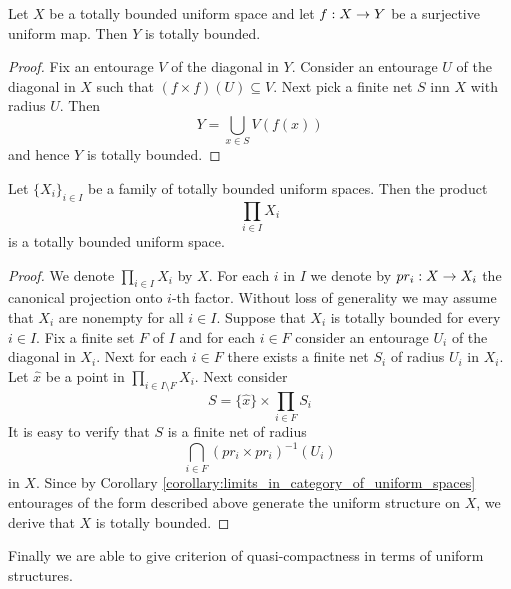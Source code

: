\begin{theorem}\label{theorem:surjective_image_of_totally_bounded_space_is_totally_bounded}
	Let $X$ be a totally bounded uniform space and let $f:X\rightarrow Y$ be a surjective uniform map. Then $Y$ is totally bounded.
\end{theorem}
\begin{proof}
	Fix an entourage $V$ of the diagonal in $Y$. Consider an entourage $U$ of the diagonal in $X$ such that $\left(f\times f\right)\left(U\right) \subseteq V$. Next pick a finite net $S$ inn $X$ with radius $U$. Then
	$$Y = \bigcup_{x\in S}V\left(f(x)\right)$$
	and hence $Y$ is totally bounded.
\end{proof}

\begin{theorem}\label{theorem:product_of_totally_bounded_spaces_is_totally_bounded}
	Let $\{X_i\}_{i \in I}$ be a family of totally bounded uniform spaces. Then the product
	$$\prod_{i \in I}X_i$$
	is a totally bounded uniform space.
\end{theorem}
\begin{proof}
	We denote $\prod_{i \in I}X_i$ by $X$. For each $i$ in $I$ we denote by $pr_i:X\rightarrow X_i$ the canonical projection onto $i$-th factor. Without loss of generality we may assume that $X_i$ are nonempty for all $i \in I$. Suppose that $X_i$ is totally bounded for every $i \in I$. Fix a finite set $F$ of $I$ and for each $i \in F$ consider an entourage $U_i$ of the diagonal in $X_i$. Next for each $i \in F$ there exists a finite net $S_i$ of radius $U_i$ in $X_i$. Let $\hat{x}$ be a point in $\prod_{i \in I\setminus F}X_i$. Next consider
	$$S = \{\hat{x}\}\times \prod_{i \in F}S_i$$
	It is easy to verify that $S$ is a finite net of radius
	$$\bigcap_{i \in F}\left(pr_i\times pr_i\right)^{-1}(U_i)$$
	in $X$. Since by Corollary \ref{corollary:limits_in_category_of_uniform_spaces} entourages of the form described above generate the uniform structure on $X$, we derive that $X$ is totally bounded.
\end{proof}
\noindent
Finally we are able to give criterion of quasi-compactness in terms of uniform structures.

